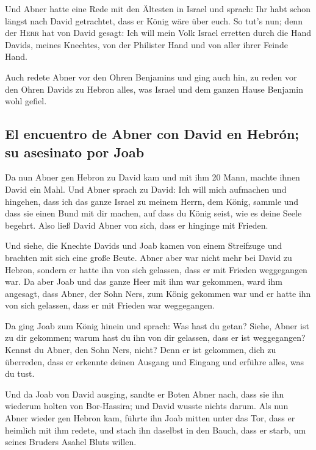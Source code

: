  Und Abner hatte eine Rede mit den Ältesten in Israel und
sprach: Ihr habt schon längst nach David getrachtet, dass er König wäre
über euch.  So tut's nun; denn der \textsc{Herr} hat von
David gesagt: Ich will mein Volk Israel erretten durch die Hand Davids,
meines Knechtes, von der Philister Hand und von aller ihrer Feinde Hand.

 Auch redete Abner vor den Ohren Benjamins und ging auch
hin, zu reden vor den Ohren Davids zu Hebron alles, was Israel und dem
ganzen Hause Benjamin wohl gefiel.

\hypertarget{el-encuentro-de-abner-con-david-en-hebruxf3n-su-asesinato-por-joab}{%
\subsection{El encuentro de Abner con David en Hebrón; su asesinato por
Joab}\label{el-encuentro-de-abner-con-david-en-hebruxf3n-su-asesinato-por-joab}}

 Da nun Abner gen Hebron zu David kam und mit ihm 20
Mann, machte ihnen David ein Mahl.  Und Abner sprach zu
David: Ich will mich aufmachen und hingehen, dass ich das ganze Israel
zu meinem Herrn, dem König, sammle und dass sie einen Bund mit dir
machen, auf dass du König seist, wie es deine Seele begehrt. Also ließ
David Abner von sich, dass er hinginge mit Frieden.

 Und siehe, die Knechte Davids und Joab kamen von einem
Streifzuge und brachten mit sich eine große Beute. Abner aber war nicht
mehr bei David zu Hebron, sondern er hatte ihn von sich gelassen, dass
er mit Frieden weggegangen war.  Da aber Joab und das
ganze Heer mit ihm war gekommen, ward ihm angesagt, dass Abner, der Sohn
Ners, zum König gekommen war und er hatte ihn von sich gelassen, dass er
mit Frieden war weggegangen.

 Da ging Joab zum König hinein und sprach: Was hast du
getan? Siehe, Abner ist zu dir gekommen; warum hast du ihn von dir
gelassen, dass er ist weggegangen?  Kennst du Abner, den
Sohn Ners, nicht? Denn er ist gekommen, dich zu überreden, dass er
erkennte deinen Ausgang und Eingang und erführe alles, was du tust.

 Und da Joab von David ausging, sandte er Boten Abner
nach, dass sie ihn wiederum holten von Bor-Hassira; und David wusste
nichts darum.  Als nun Abner wieder gen Hebron kam,
führte ihn Joab mitten unter das Tor, dass er heimlich mit ihm redete,
und stach ihn daselbst in den Bauch, dass er starb, um seines Bruders
Asahel Bluts willen.

